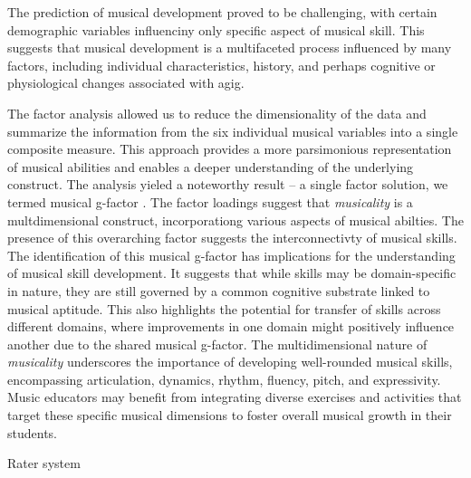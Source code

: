 The prediction of musical development proved to be challenging, with certain demographic variables influenciny only specific aspect of musical skill. This suggests that musical development is a multifaceted process influenced by many factors, including individual characteristics, history, and perhaps cognitive or physiological changes associated with agig.

The factor analysis allowed us to reduce the dimensionality of the data and summarize the information from the six individual musical variables into a single composite measure. This approach provides a more parsimonious representation of musical abilities and enables a deeper understanding of the underlying construct. The analysis yieled a noteworthy result -- a single factor solution, we termed musical g-factor \cite{Pausch2022}. The factor loadings suggest that \textit{musicality} is a multdimensional construct, incorporationg various aspects of musical abilties. The presence of this overarching factor suggests the interconnectivty of musical skills. The identification of this musical g-factor has implications for the understanding of musical skill development. It suggests that while skills may be domain-specific in nature, they are still governed by a common cognitive substrate linked to musical aptitude. This also highlights the potential for transfer of skills across different domains, where improvements in one domain might positively influence another due to the shared musical g-factor.
The multidimensional nature of \textit{musicality} underscores the importance of developing well-rounded musical skills, encompassing articulation, dynamics, rhythm, fluency, pitch, and expressivity. Music educators may benefit from integrating diverse exercises and activities that target these specific musical dimensions to foster overall musical growth in their students.



Rater system \\


